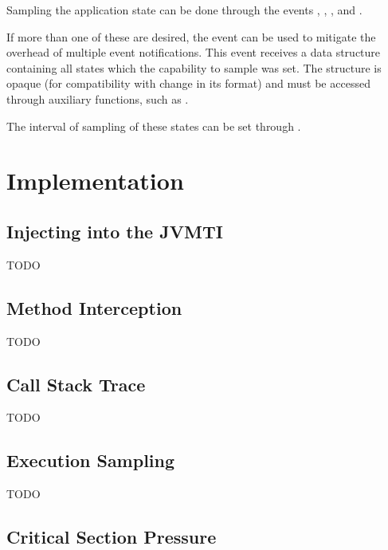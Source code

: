Sampling the application state can be done through the events , , ,  and .

If more than one of these are desired, the  event can be used to mitigate the overhead of multiple event notifications. This event receives a data structure containing all states which the capability to sample was set. The structure is opaque (for compatibility with change in its format) and must be accessed through auxiliary functions, such as .

The interval of sampling of these states can be set through .

\section{Implementation} \label{sec:impl}

\subsection{Injecting into the JVMTI}

TODO



\subsection{Method Interception}

TODO

\subsection{Call Stack Trace} \label{sec:impl_callstacktrace}

TODO

\subsection{Execution Sampling}

TODO

\subsection{Critical Section Pressure}

